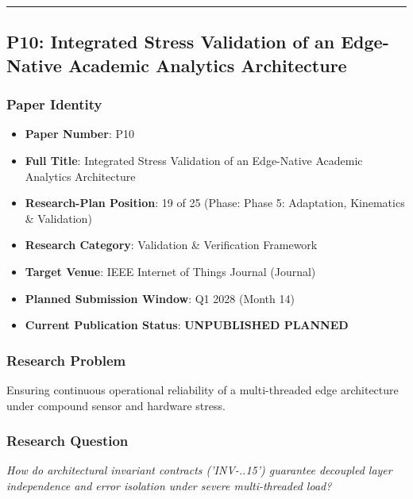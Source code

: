 \documentclass[11pt,letterpaper]{article}
\begin{document}
\vspace{0.4cm}
\hrule

\subsection{P10: Integrated Stress Validation of an Edge-\allowbreak Native Academic Analytics Architecture}
\label{sec:profile_p10}

\subsubsection{Paper Identity}
\begin{itemize}[leftmargin=*]
    \item \textbf{Paper Number}: P10
    \item \textbf{Full Title}: Integrated Stress Validation of an Edge-\allowbreak Native Academic Analytics Architecture
    \item \textbf{Research-Plan Position}: 19 of 25 (Phase: Phase 5: Adaptation, Kinematics \& Validation)
    \item \textbf{Research Category}: Validation \& Verification Framework
    \item \textbf{Target Venue}: IEEE Internet of Things Journal (Journal)
    \item \textbf{Planned Submission Window}: Q1 2028 (Month 14)
    \item \textbf{Current Publication Status}: \textbf{UNPUBLISHED PLANNED}
\end{itemize}

\subsubsection{Research Problem}
Ensuring continuous operational reliability of a multi-\allowbreak threaded edge architecture under compound sensor and hardware stress.

\subsubsection{Research Question}
\begin{tcolorbox}[colback=blue!3!white,colframe=blue!50!black,title=Primary Scientific Question]
\textit{How do architectural invariant contracts ('INV-..15') guarantee decoupled layer independence and error isolation under severe multi-\allowbreak threaded load?}
\end{tcolorbox}
\end{document}
